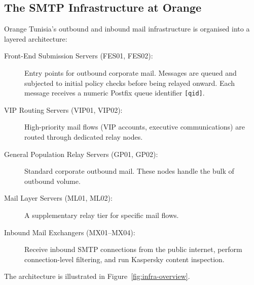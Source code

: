 \documentclass[12pt,a4paper,oneside]{report}
\begin{document}
\subsection{The SMTP Infrastructure at Orange}

Orange Tunisia's outbound and inbound mail infrastructure is organised into a layered architecture:

\begin{description}
  \item[Front-End Submission Servers (FES01, FES02):] Entry points for outbound corporate mail. Messages are queued and subjected to initial policy checks before being relayed onward. Each message receives a numeric Postfix queue identifier \texttt{[qid]}.
  \item[VIP Routing Servers (VIP01, VIP02):] High-priority mail flows (VIP accounts, executive communications) are routed through dedicated relay nodes.
  \item[General Population Relay Servers (GP01, GP02):] Standard corporate outbound mail. These nodes handle the bulk of outbound volume.
  \item[Mail Layer Servers (ML01, ML02):] A supplementary relay tier for specific mail flows.
  \item[Inbound Mail Exchangers (MX01--MX04):] Receive inbound SMTP connections from the public internet, perform connection-level filtering, and run Kaspersky content inspection.
\end{description}

The architecture is illustrated in Figure~\ref{fig:infra-overview}.
\end{document}

